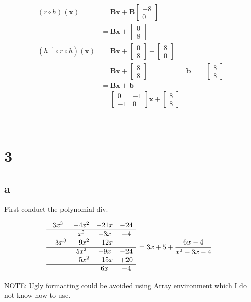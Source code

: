 \documentclass{article}
\newcommand{\blankpage}{
    \newpage
    \
    \newpage
}
\begin{document}
\begin{align*}
    (r \circ h)(\mathbf x)
        &= \mathbf {Bx} + \mathbf B\begin{bmatrix} -8 \\ 0\end{bmatrix} \\
        &= \mathbf {Bx} + \begin{bmatrix} 0 \\ 8\end{bmatrix} \\
    (h^{-1} \circ r \circ h)(\mathbf x)
        &= \mathbf {Bx} + \begin{bmatrix} 0 \\ 8\end{bmatrix} + \begin{bmatrix} 8 \\ 0\end{bmatrix}\\
        &= \mathbf {Bx} + \begin{bmatrix} 8 \\ 8\end{bmatrix} & 
    \mathbf b &= \begin{bmatrix} 8 \\ 8\end{bmatrix} \\
        &= \mathbf {Bx + b} \\
        &= \begin{bmatrix}
            0 & -1 \\
            -1 & 0
        \end{bmatrix}\mathbf x + \begin{bmatrix} 8 \\ 8\end{bmatrix}
\end{align*}

\blankpage
\section{3}
\subsection{a}

First conduct the polynomial div.

$$
\begin{matrix}
    3 x^3 & - 4 x^2 & - 21 x & - 24 \\
    \hline 
          & x ^ 2   & - 3  x & - 4 \\
    -3x^3 & + 9 x^2 & + 12 x \\
    \hline
          & 5   x^2 & - 9 x & - 24 \\
          & -5  x^2 & +15 x & + 20 \\
    \hline
          &         &  6 x & - 4
\end{matrix} ~~ = 3x + 5 + \frac{6 x - 4}{x ^ 2 - 3  x - 4}
$$
\begin{center}
    NOTE: Ugly formatting could be avoided using Array environment which I do not know how to use.
\end{center}
\end{document}
